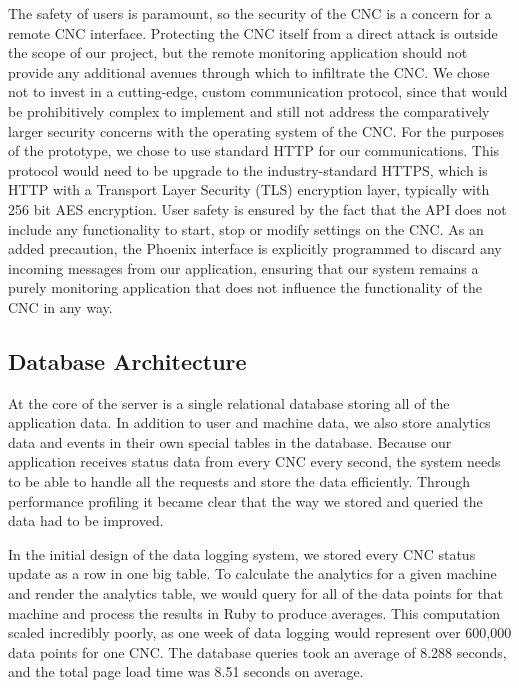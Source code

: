 \documentclass[12pt,letterpaper,titlepage]{article}
\begin{document}
The safety of users is paramount, so the security of the CNC is a concern for a remote CNC interface. Protecting the CNC itself from a direct attack is outside the scope of our project, but the remote monitoring application should not provide any additional avenues through which to infiltrate the CNC.
We chose not to invest in a cutting-edge, custom communication protocol, since that would be prohibitively complex to implement and still not address the comparatively larger security concerns with the operating system of the CNC.
For the purposes of the prototype, we chose to use standard HTTP for our communications. This protocol would need to be upgrade to the industry-standard HTTPS, which is HTTP with a Transport Layer Security (TLS) encryption layer, typically with 256 bit AES encryption.
User safety is ensured by the fact that the API does not include any functionality to start, stop or modify settings on the CNC. As an added precaution, the Phoenix interface is explicitly programmed to discard any incoming messages from our application, ensuring that our system remains a purely monitoring application that does not influence the functionality of the CNC in any way.

\subsection{Database Architecture} \label{sec:DatabaseArchitecture}

At the core of the server is a single relational database storing all of the application data. 
In addition to user and machine data, we also store analytics data and events in their own special tables in the database. Because our application receives status data from every CNC every second, the system needs to be able to handle all the requests and store the data efficiently. Through performance profiling it became clear that the way we stored and queried the data had to be improved.

In the initial design of the data logging system, we stored every CNC status update as a row in one big table. To calculate the analytics for a given machine and render the analytics table, we would query for all of the data points for that machine and process the results in Ruby to produce averages. This computation scaled incredibly poorly, as one week of data logging would represent over 600,000 data points for one CNC. The database queries took an average of 8.288 seconds, and the total page load time was 8.51 seconds on average.
\end{document}
